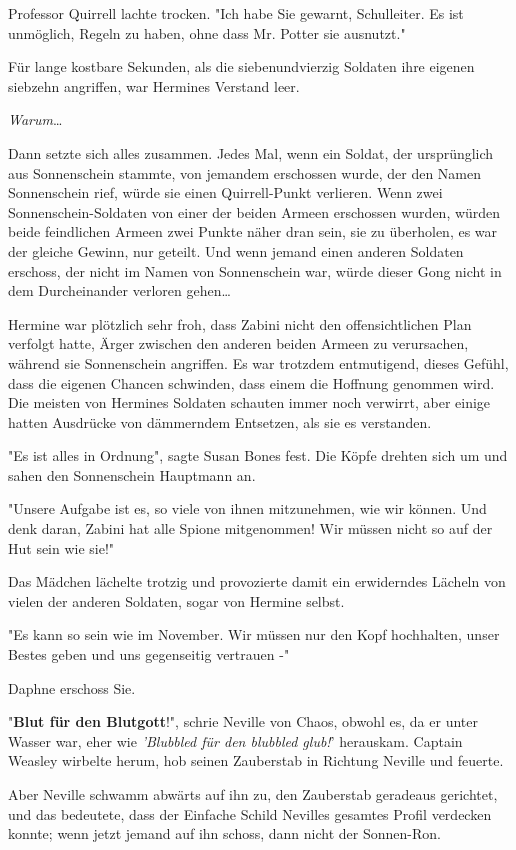 {Professor Quirrell lachte trocken. "Ich habe Sie gewarnt, Schulleiter. Es ist unmöglich, Regeln zu haben, ohne dass Mr. Potter sie ausnutzt."

Für lange kostbare Sekunden, als die siebenundvierzig Soldaten ihre eigenen siebzehn angriffen, war Hermines Verstand leer.

\emph{Warum}…

Dann setzte sich alles zusammen. Jedes Mal, wenn ein Soldat, der ursprünglich aus Sonnenschein stammte, von jemandem erschossen wurde, der den Namen Sonnenschein rief, würde sie einen Quirrell-Punkt verlieren. Wenn zwei Sonnenschein-Soldaten von einer der beiden Armeen erschossen wurden, würden beide feindlichen Armeen zwei Punkte näher dran sein, sie zu überholen, es war der gleiche Gewinn, nur geteilt. Und wenn jemand einen anderen Soldaten erschoss, der nicht im Namen von Sonnenschein war, würde dieser Gong nicht in dem Durcheinander verloren gehen…

Hermine war plötzlich sehr froh, dass Zabini nicht den offensichtlichen Plan verfolgt hatte, Ärger zwischen den anderen beiden Armeen zu verursachen, während sie Sonnenschein angriffen. Es war trotzdem entmutigend, dieses Gefühl, dass die eigenen Chancen schwinden, dass einem die Hoffnung genommen wird. Die meisten von Hermines Soldaten schauten immer noch verwirrt, aber einige hatten Ausdrücke von dämmerndem Entsetzen, als sie es verstanden.

"Es ist alles in Ordnung", sagte Susan Bones fest. Die Köpfe drehten sich um und sahen den Sonnenschein Hauptmann an.

"Unsere Aufgabe ist es, so viele von ihnen mitzunehmen, wie wir können. Und denk daran, Zabini hat alle Spione mitgenommen! Wir müssen nicht so auf der Hut sein wie sie!"

Das Mädchen lächelte trotzig und provozierte damit ein erwiderndes Lächeln von vielen der anderen Soldaten, sogar von Hermine selbst.

"Es kann so sein wie im November. Wir müssen nur den Kopf hochhalten, unser Bestes geben und uns gegenseitig vertrauen -"

Daphne erschoss Sie.

"\textbf{Blut für den Blutgott}!", schrie Neville von Chaos, obwohl es, da er unter Wasser war, eher wie \emph{'Blubbled für den blubbled glub!}' herauskam. Captain Weasley wirbelte herum, hob seinen Zauberstab in Richtung Neville und feuerte.

Aber Neville schwamm abwärts auf ihn zu, den Zauberstab geradeaus gerichtet, und das bedeutete, dass der Einfache Schild Nevilles gesamtes Profil verdecken konnte; wenn jetzt jemand auf ihn schoss, dann nicht der Sonnen-Ron.

}
